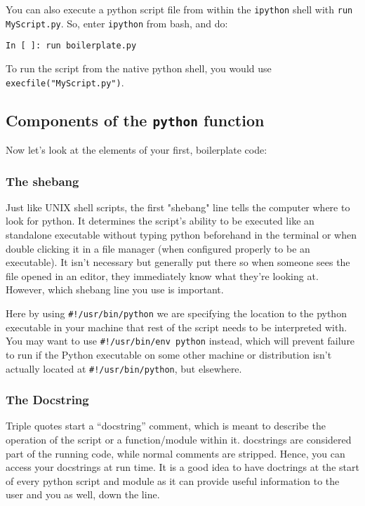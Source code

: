 You can also execute a python script file from within the {\tt ipython} 
shell with {\tt run MyScript.py}. So, enter {\tt ipython} from bash, 
and do: 
\begin{lstlisting} 
In [ ]: run boilerplate.py
\end{lstlisting}

To run the script from the native python shell, you would use {\tt 
execfile("MyScript.py")}.

\subsection{Components of the {\tt python} function}

Now let's look at the elements of your first, boilerplate code:

\subsubsection{The shebang}

Just like UNIX shell scripts, the first "shebang" line tells the 
computer where to look for python. It determines the script's ability 
to be executed like an standalone executable without typing python 
beforehand in the terminal or when double clicking it in a file 
manager (when configured properly to be an executable). It isn't 
necessary but generally put there so when someone sees the file opened 
in an editor, they immediately know what they're looking at. However, 
which shebang line you use is important. 

Here by using {\tt \#!/usr/bin/python} we are specifying the location 
to the python executable in your machine that rest of the script needs 
to be interpreted with. You may want to use {\tt \#!/usr/bin/env 
python} instead, which will prevent failure to run if the Python 
executable on some other machine or distribution isn't actually located 
at {\tt \#!/usr/bin/python}, but elsewhere.

\subsubsection{The Docstring}

Triple quotes start a ``docstring'' comment, which is meant to describe 
the operation of the script or a function/module within it. docstrings 
are considered part of the running code, while normal comments are 
stripped. Hence, you can access your docstrings at run time. It is a 
good idea to have doctrings at the start of every python script and 
module as it can provide useful information to the user and you as 
well, down the line. 

